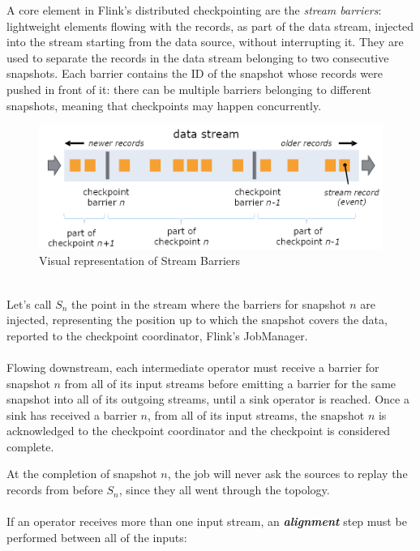 A core element in Flink’s distributed checkpointing are the \textit{stream barriers}: lightweight elements flowing with the records, as part of the data stream, injected into the stream starting from the data source, without interrupting it. They are used to separate the records in the data stream belonging to two consecutive snapshots. Each barrier contains the ID of the snapshot whose records were pushed in front of it: there can be multiple barriers belonging to different snapshots, meaning that checkpoints may happen concurrently.
\\
\begin{figure}[!htb]
    \centering
    \includegraphics[width=1\linewidth]{Figures/stream_barriers}
    \caption{Visual representation of Stream Barriers}
    \label{fig:streambarriers}
\end{figure}
\\
Let's call $S_n$ the point in the stream where the barriers for snapshot $n$ are injected, representing the position up to which the snapshot covers the data, reported to the checkpoint coordinator, Flink’s JobManager.
\\\\
Flowing downstream, each intermediate operator must receive a barrier for snapshot $n$ from all of its input streams before emitting a barrier for the same snapshot into all of its outgoing streams, until a sink operator is reached. Once a sink has received a barrier $n$, from all of its input streams, the snapshot $n$ is acknowledged to the checkpoint coordinator and the checkpoint is considered complete.

At the completion of snapshot $n$, the job will never ask the sources to replay the records from before $S_n$, since they all went through the topology.
\\\\

If an operator receives more than one input stream, an \textit{\textbf{alignment}} step must be performed between all of the inputs:

